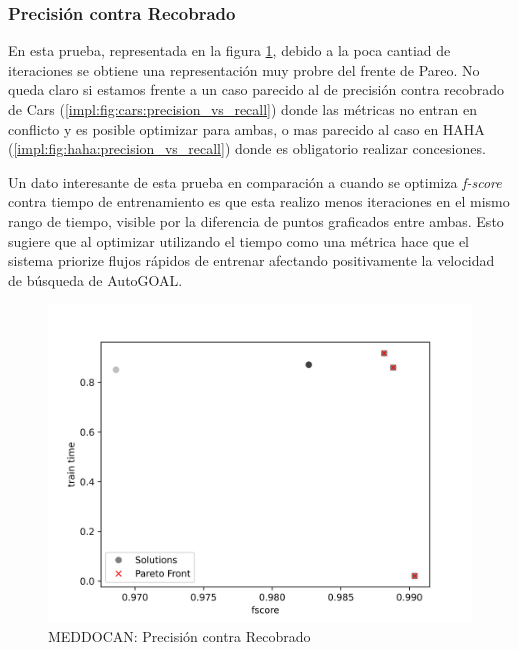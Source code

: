 \subsubsection{Precisi\'on contra Recobrado}
En esta prueba, representada en la figura \ref{impl:fig:MEDDOCAN:precision_vs_recall}, debido a la poca cantiad de iteraciones se obtiene una representaci\'on muy probre del frente de Pareo. No queda claro si estamos frente a un caso parecido al de precisi\'on contra recobrado de Cars (\ref{impl:fig:cars:precision_vs_recall}) donde las m\'etricas no entran en conflicto y es posible optimizar para ambas, o mas parecido al caso en HAHA (\ref{impl:fig:haha:precision_vs_recall}) donde es obligatorio realizar concesiones.

Un dato interesante de esta prueba en comparaci\'on a cuando se optimiza \textit{f-score} contra tiempo de entrenamiento es que esta realizo menos iteraciones en el mismo rango de tiempo, visible por la diferencia de puntos graficados entre ambas. Esto sugiere que al optimizar utilizando el tiempo como una m\'etrica hace que el sistema priorize flujos r\'apidos de entrenar afectando positivamente la velocidad de b\'usqueda de AutoGOAL.

\begin{figure}[ht]
    \centering
    \includegraphics[scale=0.65]{Pictures/meddocan_precision_vs_recall.jpg}
    \caption{MEDDOCAN: Precisi\'on contra Recobrado}
    \label{impl:fig:MEDDOCAN:precision_vs_recall}
\end{figure}
